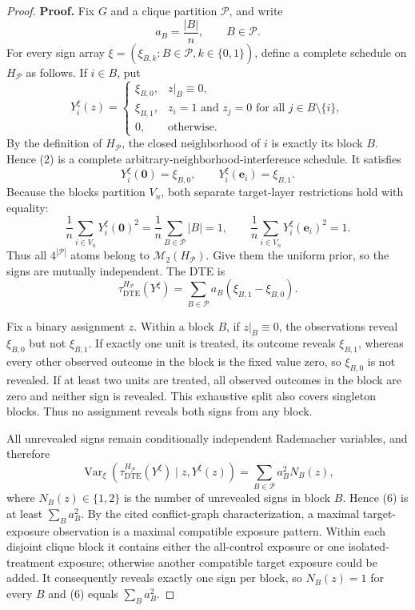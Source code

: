 \documentclass{article}
\begin{document}
\begin{proof}
\textbf{Proof.}
Fix \(G\) and a clique partition \(\mathcal P\), and write
\[
a_B=\frac{|B|}{n},\qquad B\in\mathcal P.
\tag{1}
\]
For every sign array \(\xi=(\xi_{B,k}:B\in\mathcal P,k\in\{0,1\})\), define a complete schedule on \(H_{\mathcal P}\) as follows.  If \(i\in B\), put
\[
Y_i^{\xi}(z)=
\begin{cases}
\xi_{B,0},&z|_B\equiv0,\\
\xi_{B,1},&z_i=1\text{ and }z_j=0\text{ for all }j\in B\setminus\{i\},\\
0,&\text{otherwise}.
\end{cases}
\tag{2}
\]
By the definition of \(H_{\mathcal P}\), the closed neighborhood of \(i\) is exactly its block \(B\).  Hence (2) is a complete arbitrary-neighborhood-interference schedule.  It satisfies
\[
Y_i^{\xi}(\mathbf0)=\xi_{B,0},
\qquad
Y_i^{\xi}(\mathbf e_i)=\xi_{B,1}.
\tag{3}
\]
Because the blocks partition \(V_n\), both separate target-layer restrictions hold with equality:
\[
\frac1n\sum_{i\in V_n}Y_i^{\xi}(\mathbf0)^2
=\frac1n\sum_{B\in\mathcal P}|B|=1,
\qquad
\frac1n\sum_{i\in V_n}Y_i^{\xi}(\mathbf e_i)^2=1.
\tag{4}
\]
Thus all \(4^{|\mathcal P|}\) atoms belong to \(\mathcal M_2(H_{\mathcal P})\).  Give them the uniform prior, so the signs are mutually independent.  The DTE is
\[
\tau_{\mathrm{DTE}}^{H_{\mathcal P}}(Y^{\xi})
=\sum_{B\in\mathcal P}a_B(\xi_{B,1}-\xi_{B,0}).
\tag{5}
\]

Fix a binary assignment \(z\).  Within a block \(B\), if \(z|_B\equiv0\), the observations reveal \(\xi_{B,0}\) but not \(\xi_{B,1}\).  If exactly one unit is treated, its outcome reveals \(\xi_{B,1}\), whereas every other observed outcome in the block is the fixed value zero, so \(\xi_{B,0}\) is not revealed.  If at least two units are treated, all observed outcomes in the block are zero and neither sign is revealed.  This exhaustive split also covers singleton blocks.  Thus no assignment reveals both signs from any block.

All unrevealed signs remain conditionally independent Rademacher variables, and therefore
\[
\operatorname{Var}_{\xi}\!\left(
\tau_{\mathrm{DTE}}^{H_{\mathcal P}}(Y^{\xi})
\mid z,Y^{\xi}(z)
\right)
=\sum_{B\in\mathcal P}a_B^2N_B(z),
\tag{6}
\]
where \(N_B(z)\in\{1,2\}\) is the number of unrevealed signs in block \(B\).  Hence (6) is at least \(\sum_Ba_B^2\).  By the cited conflict-graph characterization, a maximal target-exposure observation is a maximal compatible exposure pattern.  Within each disjoint clique block it contains either the all-control exposure or one isolated-treatment exposure; otherwise another compatible target exposure could be added.  It consequently reveals exactly one sign per block, so \(N_B(z)=1\) for every \(B\) and (6) equals \(\sum_Ba_B^2\).


\end{proof}
\end{document}
